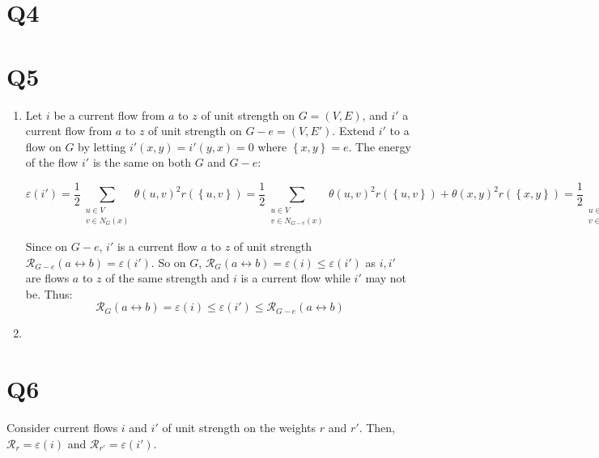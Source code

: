 \documentclass[a4paper, 11pt]{article}
\def\set#1{\left\{ #1 \right\}}
\begin{document}
\section*{Q4}


\section*{Q5}
\begin{enumerate}[label=(\alph*)]
	\item
	      Let $i$ be a current flow from $a$ to $z$ of unit strength on $G=(V,E)$, and $i'$ a current flow from $a$ to $z$ of unit strength on $G-e=(V,E')$. Extend $i'$ to a flow on $G$ by letting $i'(x,y)=i'(y,x)=0$ where $\set{x,y}=e$. The energy of the flow $i'$ is the same on both $G$ and $G-e$:

	      \[
		      \varepsilon(i')
		      =\frac12\sum_{\substack{u\in V\\ v\in N_G(x)}}\theta(u,v)^2r(\set{u,v})
		      =\frac12\sum_{\substack{u\in V\\ v\in N_{G-e}(x)}}\theta(u,v)^2r(\set{u,v}) + \theta(x,y)^2r(\set{x,y})
		      =\frac12\sum_{\substack{u\in V\\ v\in N_{G-e}(x)}}\theta(u,v)^2r(\set{u,v})
	      \]

	      Since on $G-e$, $i'$ is a current flow $a$ to $z$ of unit strength $\mathcal{R}_{G-e}(a\leftrightarrow b)=\varepsilon(i')$. So on $G$, $\mathcal{R}_G(a\leftrightarrow b)=\varepsilon(i)\leq\varepsilon(i')$ as $i,i'$ are flows $a$ to $z$ of the same strength and $i$ is a current flow while $i'$ may not be. Thus:
	      $$\mathcal{R}_G(a\leftrightarrow b)=\varepsilon(i)\leq\varepsilon(i')\leq \mathcal{R}_{G-e}(a\leftrightarrow b)$$


	\item
\end{enumerate}

\section*{Q6}

Consider current flows $i$ and $i'$ of unit strength on the weights $r$ and $r'$. Then, $\mathcal{R}_r=\varepsilon(i)$ and $\mathcal{R}_{r'}=\varepsilon(i')$.



\end{document}
